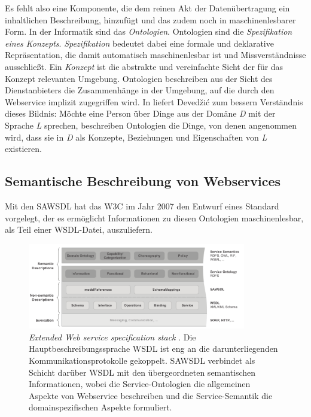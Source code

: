 Es fehlt also eine Komponente, die dem reinen Akt der Datenübertragung ein inhaltlichen Beschreibung, hinzufügt und das zudem noch in maschinenlesbarer Form. In der Informatik sind das \emph{Ontologien}. Ontologien sind die \emph{Spezifikation eines Konzepts}. \emph{Spezifikation} bedeutet dabei eine formale und deklarative Repräsentation, die damit automatisch maschinenlesbar ist und Missverständnisse ausschließt. Ein \emph{Konzept} ist die abstrakte und vereinfachte Sicht der für das Konzept relevanten Umgebung. Ontologien beschreiben aus der Sicht des Dienstanbieters die Zusammenhänge in der Umgebung, auf die durch den Webservice implizit zugegriffen wird. In \cite[S.31]{dcswe} liefert Devedžić zum bessern Verständnis dieses Bildnis: Möchte eine Person über Dinge aus der Domäne \emph{D} mit der Sprache \emph{L} sprechen, beschreiben Ontologien die Dinge, von denen angenommen wird, dass sie in \emph{D} als Konzepte, Beziehungen und Eigenschaften von \emph{L} existieren.

\subsection{Semantische Beschreibung von Webservices}\label{l:sawsdl}

Mit den \ac{SAWSDL} hat das \ac{W3C} im Jahr 2007 den Entwurf eines Standard vorgelegt, der es ermöglicht Informationen zu diesen Ontologien maschinenlesbar, als Teil einer \ac{WSDL}-Datei, auszuliefern. 

\begin{figure}[ht]
\centering
\parbox{0.85\textwidth}{
    \includegraphics[width=0.85\textwidth]{media/Extended-Web-Service-Specification-Stack.pdf}
    \caption{\emph{Extended Web service specification stack} \cite[S.63]{ky-sawsdl}. Die Hauptbeschreibungssprache \ac{WSDL} ist eng an die darunterliegenden Kommunikationsprotokolle gekoppelt. \ac{SAWSDL} verbindet als Schicht darüber \ac{WSDL} mit den übergeordneten semantischen Informationen, wobei die Service-Ontologien die allgemeinen Aspekte von Webservice beschreiben und die Service-Semantik die domainspezifischen Aspekte formuliert.}
    \label{f:ewsss}
}
\end{figure}

